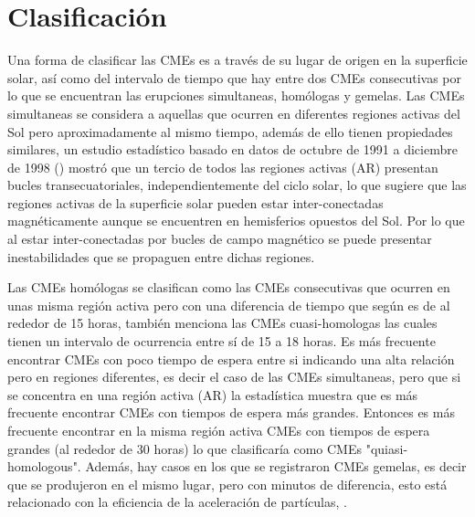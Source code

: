 \section{Clasificación}
Una forma de clasificar las \acp{CME} es a través de su lugar de origen en la superficie solar, así como del intervalo de tiempo que hay entre dos \acp{CME} consecutivas por lo que se encuentran las erupciones simultaneas, homólogas y gemelas. Las \acp{CME} simultaneas se considera a aquellas que ocurren en diferentes regiones activas del Sol pero aproximadamente al mismo tiempo, además de ello tienen propiedades similares, un estudio estadístico basado en datos de octubre de 1991 a diciembre de 1998 (\cite{Pevtsov_2000}) mostró que un tercio de todos las regiones activas (AR) presentan bucles transecuatoriales, independientemente del ciclo solar, lo que sugiere que las regiones activas de la superficie solar pueden estar inter-conectadas magnéticamente aunque se encuentren en hemisferios opuestos del Sol. Por lo que al estar inter-conectadas por bucles de campo magnético se puede presentar inestabilidades que se propaguen entre dichas regiones. 

Las \acp{CME} homólogas se clasifican como las \acp{CME} consecutivas que ocurren en unas misma región activa pero con una diferencia de tiempo que según \cite[~p.10]{lugaz-2017} es de al rededor de 15 horas, también menciona las \acp{CME} cuasi-homologas las cuales tienen un intervalo de ocurrencia entre sí de 15 a 18 horas. Es más frecuente encontrar \acp{CME} con poco tiempo de espera entre si indicando una alta relación pero en regiones diferentes, es decir el caso de las \acp{CME} simultaneas, pero que si se concentra en una región activa (AR) la estadística muestra que es más frecuente encontrar \acp{CME} con tiempos de espera más grandes. Entonces es más frecuente encontrar en la misma región activa \acp{CME} con tiempos de espera grandes (al rededor de 30 horas) lo que clasificaría como \acp{CME} "quiasi-homologous". Además, hay casos en los que se registraron \acp{CME} gemelas, es decir que se produjeron en el mismo lugar, pero con minutos de diferencia, esto está relacionado con la eficiencia de la aceleración de partículas, \cite{lugaz-2017}.

